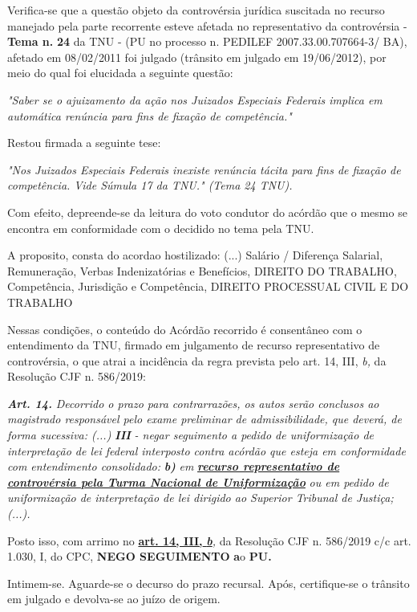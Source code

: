 \documentclass[12pt]{article}
\begin{document}
\justifying
\noindent Verifica-se que a questão objeto da controvérsia jurídica suscitada no recurso manejado pela parte recorrente esteve afetada no representativo da controvérsia - \textbf{Tema n. }\textbf{24} da TNU - (PU no processo n. PEDILEF 2007.33.00.707664-3/ BA),  afetado em 08/02/2011 foi julgado (trânsito em julgado em 19/06/2012), por meio do qual foi elucidada a seguinte questão:

\noindent \textit{"Saber se o ajuizamento da ação nos Juizados Especiais Federais implica em automática renúncia para fins de fixação de competência."}

\noindent Restou firmada a seguinte tese:

\noindent \textit{"Nos Juizados Especiais Federais inexiste renúncia tácita para fins de fixação de competência. Vide Súmula 17 da TNU." (Tema 24 TNU).}

\noindent Com efeito, depreende-se da leitura do voto condutor do acórdão que o mesmo se encontra em conformidade com o decidido no  tema pela TNU.

\noindent A proposito, consta do acordao hostilizado: (...) Salário / Diferença Salarial, Remuneração, Verbas Indenizatórias e Benefícios, DIREITO DO TRABALHO, Competência, Jurisdição e Competência, DIREITO PROCESSUAL CIVIL E DO TRABALHO

\noindent Nessas condições, o conteúdo do Acórdão recorrido é consentâneo com o entendimento da TNU, firmado em julgamento de recurso representativo de controvérsia, o que atrai a incidência da regra prevista pelo art. 14, III, \textit{b,} da Resolução CJF n. 586/2019:

\noindent \textit{\textbf{Art. 14.}}\textit{ Decorrido o prazo para contrarrazões, os autos serão conclusos ao magistrado responsável pelo exame preliminar de admissibilidade, que deverá, de forma sucessiva: (...) }\textit{\textbf{III }}\textit{- negar seguimento a pedido de uniformização de interpretação de lei federal interposto contra acórdão que esteja em conformidade com entendimento consolidado: }\textit{\textbf{b)}}\textit{ em }\uline{\textit{\textbf{recurso representativo de controvérsia pela Turma Nacional de Uniformização}}}\textit{ ou em pedido de uniformização de interpretação de lei dirigido ao Superior Tribunal de Justiça;(...).}

\noindent Posto isso, com arrimo no \uline{\textbf{art. 14, III, }}\uline{\textit{\textbf{b}}}\textit{,} da Resolução CJF n. 586/2019 c/c art. 1.030, I, do CPC, \textbf{NEGO SEGUIMENTO }\textbf{a}o\textbf{ PU}\textbf{.}

\noindent Intimem-se. Aguarde-se o decurso do prazo recursal. Após, certifique-se o trânsito em julgado e devolva-se ao juízo de origem.
\end{document}
